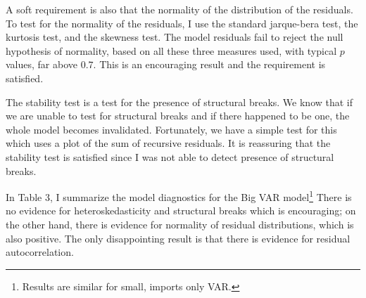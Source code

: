 \documentclass[12pt]{article}
\newcommand{\1}{\mathbbm 1}
\begin{document}
 A soft requirement is also that the normality of the distribution of the residuals. To test for the normality of the residuals, I use the standard jarque-bera test, the kurtosis test, and the skewness test. The model residuals fail to reject the null hypothesis of normality, based on all these three measures used, with typical $p$ values, far above $0.7$. This is an encouraging result and the requirement is satisfied.
 
 The stability test is a test for the presence of structural breaks. We know that if we are unable to test for structural breaks and if there happened to be one, the whole model becomes invalidated. Fortunately, we have a simple test for this which uses a plot of the sum of recursive residuals. It is reassuring that the stability test is satisfied since I was not able to detect presence of structural breaks.

In Table 3, I summarize the model diagnostics for the Big VAR model\footnote{Results are similar for small, imports only VAR.} There is no evidence for heteroskedasticity and structural breaks which is encouraging; on the other hand, there is evidence for normality of residual distributions, which is also positive. The only disappointing result is that there is evidence for residual autocorrelation. 





 
 


\begin{table}[H]%
	\def\arraystretch{1}
	\begin{center}
		{\sc \caption{Model Diagnostics for Big VAR Model}}
		\begin{adjustbox}{width=0.4\textwidth}
			\setlength{\tabcolsep}{1pt}
		\end{adjustbox}
	\end{center}
	{\footnotesize{}} %
\end{table}
\end{document}
